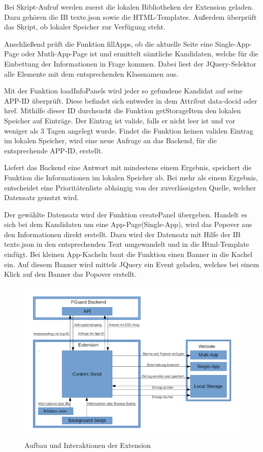 Bei Skript-Aufruf werden zuerst die lokalen Bibliotheken der Extension geladen. Dazu gehören die IB texte.json sowie die HTML-Templates. Außerdem überprüft das Skript, ob lokaler Speicher zur Verfügung steht.

Anschließend prüft die Funktion \glqq fillApps\grqq{}, ob die aktuelle Seite eine Single-App-Page oder Mutli-App-Page ist und ermittelt sämtliche Kandidaten, welche für die Einbettung der Informationen in Frage kommen. Dabei liest der JQuery-Selektor alle Elemente mit dem entsprechenden Klassnamen aus.

Mit der Funktion \glqq loadInfoPanels\grqq{} wird jeder so gefundene Kandidat auf seine APP-ID überprüft. Diese befindet sich entweder in dem Attribut \glqq data-docid\grqq{} oder \glqq href\grqq{}. Mithilfe dieser ID durchsucht die Funktion \glqq getStorageItem\grqq{} den lokalen Speicher auf Einträge. Der  Eintrag ist valide, falls er nicht leer ist und vor weniger als 3 Tagen angelegt wurde. Findet die Funktion keinen validen Eintrag im lokalen Speicher, wird eine neue Anfrage an das Backend, für die entsprechende APP-ID, erstellt.


Liefert das Backend eine Antwort mit mindestens einem Ergebnis, speichert die Funktion die Informationen im lokalen Speicher ab. Bei mehr als einem Ergebnis, entscheidet eine Prioritätenliste abhängig von der zuverlässigsten Quelle, welcher Datensatz genutzt wird.

Der gewählte Datensatz wird der Funktion \glqq createPanel\grqq{} übergeben. Handelt es sich bei dem Kandidaten um eine App-Page(Single-App), wird das Popover aus den Informationen direkt erstellt. Dazu wird der Datensatz mit Hilfe der IB texte.json in den entsprechenden Text umgewandelt und in die Html-Template einfügt.
Bei kleinen App-Kacheln baut die Funktion einen Banner in die Kachel ein. Auf diesem Banner wird mittels JQuery ein Event geladen, welches bei einem Klick auf den Banner das Popover erstellt.

%
\begin{figure}[ht]
	\centering
	\includegraphics[width=1\textwidth]{pics/Aufbau.png}
	\caption{Aufbau und Interaktionen der Extension}
	\label{aufbau}
\end{figure}
